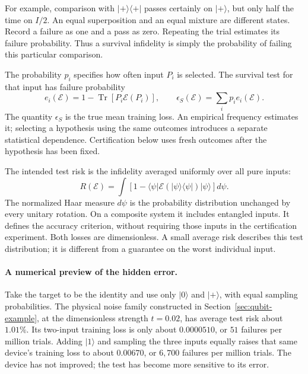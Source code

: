 \documentclass[11pt,a4paper]{article}
\newcommand{\ket}[1]{\lvert #1\rangle}
\newcommand{\bra}[1]{\langle #1\rvert}
\newcommand{\Tr}{\operatorname{Tr}}
\numberwithin{equation}{section}
\begin{document}
For example, comparison with $\ket+\bra+$ passes certainly on $\ket+$,
but only half the time on $I/2$. An equal superposition and an equal mixture
are different states.
Record a failure as one and a pass as zero. Repeating the trial estimates
its failure probability. Thus a survival infidelity is simply the
probability of failing this particular comparison.

The probability $p_i$ specifies how often input $P_i$ is selected. The survival test for that input has failure probability
\begin{equation}
 e_i(\mathcal E)=1-\Tr[P_i\mathcal E(P_i)],
 \qquad \epsilon_S(\mathcal E)=\sum_i p_i e_i(\mathcal E).
 \label{eq:intro-training}
\end{equation}
The quantity $\epsilon_S$ is the true mean training loss. An empirical frequency estimates it; selecting a hypothesis using the same outcomes introduces a separate statistical dependence. Certification below uses fresh outcomes after the hypothesis has been fixed.

The intended test risk is the infidelity averaged uniformly over all pure inputs:
\begin{equation}
 R(\mathcal E)=\int \left[1-\bra\psi\mathcal E(\ket\psi\bra\psi)\ket\psi\right]d\psi.
 \label{eq:intro-haar}
\end{equation}
The normalized Haar measure $d\psi$ is the probability distribution unchanged by every unitary rotation. On a composite system it includes entangled inputs. It defines the accuracy criterion, without requiring those inputs in the certification experiment. Both losses are dimensionless. A small average risk describes this test distribution; it is different from a guarantee on the worst individual input.

\paragraph{A numerical preview of the hidden error.}
Take the target to be the identity and use only $\ket0$ and $\ket+$,
with equal sampling probabilities. The physical noise family constructed
in Section~\ref{sec:qubit-example}, at the dimensionless strength $t=0.02$,
has average test risk about $1.01\%$. Its two-input training loss is only
about $0.0000510$, or $51$ failures per million trials. Adding $\ket1$
and sampling the three inputs equally raises that same device's training
loss to about $0.00670$, or $6{,}700$ failures per million trials. The device
has not improved; the test has become more sensitive to its error.
\end{document}
